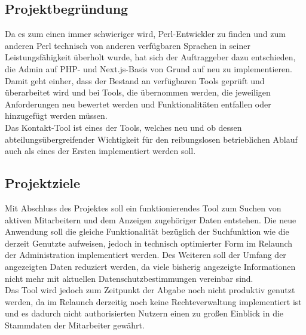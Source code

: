 \vfill
\pagebreak

\subsection{Projektbegründung}
    Da es zum einen immer schwieriger wird, Perl-Entwickler zu finden und zum anderen Perl technisch von anderen verfügbaren Sprachen in seiner Leistungsfähigkeit überholt wurde, hat sich der Auftraggeber dazu entschieden, die Admin auf PHP- und Next.js-Basis von Grund auf neu zu implementieren. Damit geht einher, dass der Bestand an verfügbaren Tools geprüft und überarbeitet wird und bei Tools, die übernommen werden, die jeweiligen Anforderungen neu bewertet werden und Funktionalitäten entfallen oder hinzugefügt werden müssen.\\
    Das Kontakt-Tool ist eines der Tools, welches neu und ob dessen abteilungsübergreifender Wichtigkeit für den reibungslosen betrieblichen Ablauf auch als eines der Ersten implementiert werden soll.

\subsection{Projektziele}
    Mit Abschluss des Projektes soll ein funktionierendes Tool zum Suchen von aktiven Mitarbeitern und dem Anzeigen zugehöriger Daten entstehen. Die neue Anwendung soll die gleiche Funktionalität bezüglich der Suchfunktion wie die derzeit Genutzte aufweisen, jedoch in technisch optimierter Form im Relaunch der Administration implementiert werden. Des Weiteren soll der Umfang der angezeigten Daten reduziert werden, da viele bisherig angezeigte Informationen nicht mehr mit aktuellen Datenschutzbestimmungen vereinbar sind.\\
    Das Tool wird jedoch zum Zeitpunkt der Abgabe noch nicht produktiv genutzt werden, da im Relaunch derzeitig noch keine Rechteverwaltung implementiert ist und es dadurch nicht authorisierten Nutzern einen zu großen Einblick in die Stammdaten der Mitarbeiter gewährt.

\vfill
\pagebreak